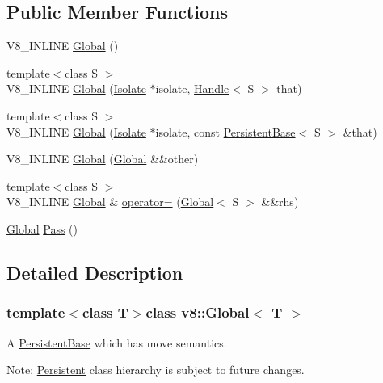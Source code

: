 \subsection*{Public Member Functions}
\begin{DoxyCompactItemize}
\item 
V8\+\_\+\+I\+N\+L\+I\+N\+E \hyperlink{classv8_1_1_global_ab1efdf25ff6305e67f3266a6fe90527e}{Global} ()
\item 
{\footnotesize template$<$class S $>$ }\\V8\+\_\+\+I\+N\+L\+I\+N\+E \hyperlink{classv8_1_1_global_a26d0a7f913252247f819a7df31c927e5}{Global} (\hyperlink{classv8_1_1_isolate}{Isolate} $\ast$isolate, \hyperlink{classv8_1_1_local}{Handle}$<$ S $>$ that)
\item 
{\footnotesize template$<$class S $>$ }\\V8\+\_\+\+I\+N\+L\+I\+N\+E \hyperlink{classv8_1_1_global_a6243ecb28bb97d066065796fa28f7415}{Global} (\hyperlink{classv8_1_1_isolate}{Isolate} $\ast$isolate, const \hyperlink{classv8_1_1_persistent_base}{Persistent\+Base}$<$ S $>$ \&that)
\item 
V8\+\_\+\+I\+N\+L\+I\+N\+E \hyperlink{classv8_1_1_global_ab8f3c754a58146e6db67012cd74a49cb}{Global} (\hyperlink{classv8_1_1_global}{Global} \&\&other)
\item 
{\footnotesize template$<$class S $>$ }\\V8\+\_\+\+I\+N\+L\+I\+N\+E \hyperlink{classv8_1_1_global}{Global} \& \hyperlink{classv8_1_1_global_a9d3d7d8f10ad23e413f2027cc15ab209}{operator=} (\hyperlink{classv8_1_1_global}{Global}$<$ S $>$ \&\&rhs)
\item 
\hyperlink{classv8_1_1_global}{Global} \hyperlink{classv8_1_1_global_a914903149cc752468d4a3a11b6089c7e}{Pass} ()
\end{DoxyCompactItemize}


\subsection{Detailed Description}
\subsubsection*{template$<$class T$>$class v8\+::\+Global$<$ T $>$}

A \hyperlink{classv8_1_1_persistent_base}{Persistent\+Base} which has move semantics.

Note\+: \hyperlink{classv8_1_1_persistent}{Persistent} class hierarchy is subject to future changes. 

